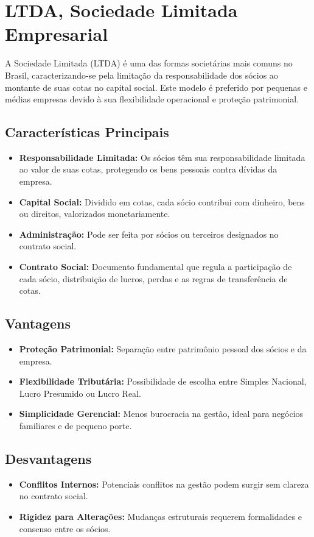 
\section{LTDA, Sociedade Limitada Empresarial}

A Sociedade Limitada (LTDA) é uma das formas societárias mais comuns no Brasil, caracterizando-se pela limitação da responsabilidade dos sócios ao montante de suas cotas no capital social. Este modelo é preferido por pequenas e médias empresas devido à sua flexibilidade operacional e proteção patrimonial.

\subsection{Características Principais}
\begin{itemize}
    \item \textbf{Responsabilidade Limitada:} Os sócios têm sua responsabilidade limitada ao valor de suas cotas, protegendo os bens pessoais contra dívidas da empresa.
    \item \textbf{Capital Social:} Dividido em cotas, cada sócio contribui com dinheiro, bens ou direitos, valorizados monetariamente.
    \item \textbf{Administração:} Pode ser feita por sócios ou terceiros designados no contrato social.
    \item \textbf{Contrato Social:} Documento fundamental que regula a participação de cada sócio, distribuição de lucros, perdas e as regras de transferência de cotas.
\end{itemize}

\subsection{Vantagens}
\begin{itemize}
    \item \textbf{Proteção Patrimonial:} Separação entre patrimônio pessoal dos sócios e da empresa.
    \item \textbf{Flexibilidade Tributária:} Possibilidade de escolha entre Simples Nacional, Lucro Presumido ou Lucro Real.
    \item \textbf{Simplicidade Gerencial:} Menos burocracia na gestão, ideal para negócios familiares e de pequeno porte.
\end{itemize}

\subsection{Desvantagens}
\begin{itemize}
    \item \textbf{Conflitos Internos:} Potenciais conflitos na gestão podem surgir sem clareza no contrato social.
    \item \textbf{Rigidez para Alterações:} Mudanças estruturais requerem formalidades e consenso entre os sócios.
\end{itemize}

